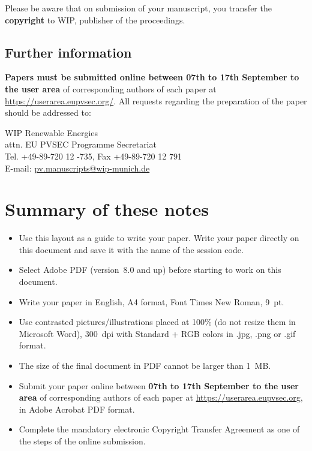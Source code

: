 \documentclass{eupvsec}
\begin{document}
Please be aware that on submission of your manuscript, you transfer
the \textbf{copyright} to WIP, publisher of the proceedings.

\subsection{Further information}

\textbf{Papers must be submitted online between 07th to 17th September
to the user area} of corresponding authors of each paper at
\url{https://userarea.eupvsec.org/}. All requests regarding the
preparation of the paper should be addressed to:

\medskip
\noindent
WIP Renewable Energies\\
attn. EU PVSEC Programme Secretariat\\
Tel. +49-89-720 12 -735, Fax +49-89-720 12 791\\
E-mail: \href{mailto:pv.manuscripts@wip-munich.de}{pv.manuscripts@wip-munich.de}
\medskip

\section{Summary of these notes}

\begin{itemize}
  \item Use this layout as a guide to write your paper. Write your
        paper directly on this document and save it with the name of
        the session code.
  \item Select Adobe PDF (version~8.0 and up) before starting to work
        on this document.
  \item Write your paper in English, A4 format, Font Times New Roman,
        9~pt.
  \item Use contrasted pictures/illustrations placed at 100\% (do not
        resize them in Microsoft Word), 300~dpi with Standard + RGB
        colors in .jpg, .png or .gif format.
  \item The size of the final document in PDF cannot be larger than
        1~MB.
  \item Submit your paper online between \textbf{07th to 17th
        September to the user area} of corresponding authors of each
        paper at \url{https://userarea.eupvsec.org}, in Adobe Acrobat
        PDF format.
  \item Complete the mandatory electronic Copyright Transfer Agreement
        as one of the steps of the online submission.
\end{itemize}
\end{document}
